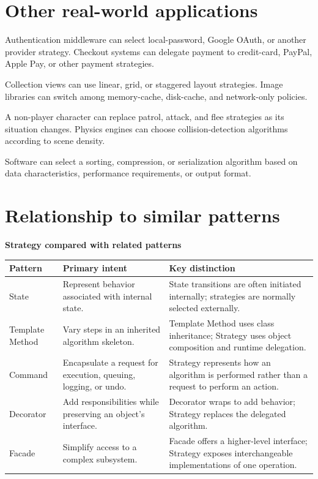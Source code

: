 \documentclass[11pt,a4paper]{report}
\begin{document}
\section{Other real-world applications}
\begin{description}[style=nextline]
  \item[Web development: authentication and payment]
  Authentication middleware can select local-password, Google OAuth, or another
  provider strategy. Checkout systems can delegate payment to credit-card,
  PayPal, Apple Pay, or other payment strategies.

  \item[Mobile development: layout and caching]
  Collection views can use linear, grid, or staggered layout strategies. Image
  libraries can switch among memory-cache, disk-cache, and network-only policies.

  \item[Game development: artificial intelligence and physics]
  A non-player character can replace patrol, attack, and flee strategies as its
  situation changes. Physics engines can choose collision-detection algorithms
  according to scene density.

  \item[Data processing: sorting and compression]
  Software can select a sorting, compression, or serialization algorithm based
  on data characteristics, performance requirements, or output format.
\end{description}

\clearpage
\section{Relationship to similar patterns}
\begin{center}
\textbf{Strategy compared with related patterns}\par\medskip
\small
\begin{tabularx}{\textwidth}{@{}lYY@{}}
\toprule
\textbf{Pattern} & \textbf{Primary intent} & \textbf{Key distinction} \\
\midrule
State & Represent behavior associated with internal state. & State transitions are often initiated internally; strategies are normally selected externally. \\
Template Method & Vary steps in an inherited algorithm skeleton. & Template Method uses class inheritance; Strategy uses object composition and runtime delegation. \\
Command & Encapsulate a request for execution, queuing, logging, or undo. & Strategy represents how an algorithm is performed rather than a request to perform an action. \\
Decorator & Add responsibilities while preserving an object's interface. & Decorator wraps to add behavior; Strategy replaces the delegated algorithm. \\
Facade & Simplify access to a complex subsystem. & Facade offers a higher-level interface; Strategy exposes interchangeable implementations of one operation. \\
\bottomrule
\end{tabularx}
\end{center}
\end{document}
